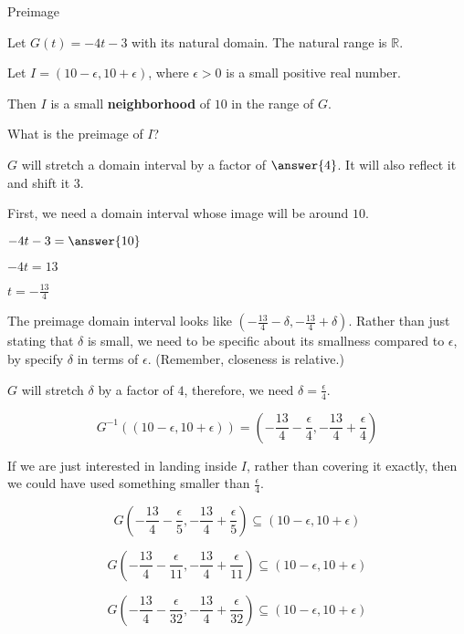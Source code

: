 \documentclass{ximera}
\begin{document}
\begin{example} Preimage

Let $G(t) = -4t - 3$ with its natural domain.  The natural range is $\mathbb{R}$.

Let  $I = (10-\epsilon, 10+\epsilon)$, where $\epsilon > 0$ is a small positive real number.  

Then $I$ is a small \textbf{neighborhood} of $10$ in the range of $G$.


What is the preimage of $I$?

\begin{explanation}





$G$ will stretch a domain interval by a factor of $\answer{4}$.  It will also reflect it and shift it $3$.  


First, we need a domain interval whose image will be around $10$.

$-4t-3 = \answer{10}$

$-4t = 13$

$t = -\frac{13}{4}$



The preimage domain interval looks like $\left( -\frac{13}{4} - \delta, -\frac{13}{4} + \delta \right)$.  Rather than just stating that $\delta$ is small, we need to be specific about its smallness compared to $\epsilon$, by specify $\delta$ in terms of $\epsilon$. (Remember, closeness is relative.)

$G$ will stretch $\delta$ by a factor of $4$, therefore,  we need $\delta = \frac{\epsilon}{4}$. 




\[   G^{-1}((10-\epsilon, 10+\epsilon)) = \left( -\frac{13}{4} - \frac{\epsilon}{4}, -\frac{13}{4} + \frac{\epsilon}{4} \right)   \]


\end{explanation}



If we are just interested in landing inside $I$, rather than covering it exactly, then we could have used something smaller than $\frac{\epsilon}{4}$.



\[    
G\left( -\frac{13}{4} - \frac{\epsilon}{5}, -\frac{13}{4} + \frac{\epsilon}{5} \right) \subseteq (10-\epsilon, 10+\epsilon)
\]


\[    
G\left( -\frac{13}{4} - \frac{\epsilon}{11}, -\frac{13}{4} + \frac{\epsilon}{11} \right) \subseteq (10-\epsilon, 10+\epsilon)
\]

\[    
G\left( -\frac{13}{4} - \frac{\epsilon}{32}, -\frac{13}{4} + \frac{\epsilon}{32} \right) \subseteq (10-\epsilon, 10+\epsilon)
\]












\end{example}
\end{document}
